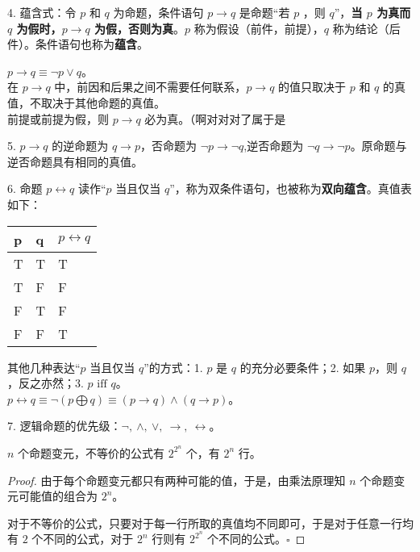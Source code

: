 \documentclass[normal,cyan]{elegantnote}
\newcommand{\QED}{\square}
\begin{document}
4. 蕴含式：令 $p$ 和 $q$ 为命题，条件语句 $p\to q$ 是命题“若 $p$ ，则 $q$”，\textbf{当 $p$ 为真而 $q$ 为假时，$p\to q$ 为假，否则为真}。$p$ 称为假设（前件，前提），$q$ 称为结论（后件）。条件语句也称为\textbf{蕴含}。

\begin{note}
    $p \to q \equiv \neg p \vee q$。
    \\在 $p \to q$ 中，前因和后果之间不需要任何联系，$p \to q$ 的值只取决于 $p$ 和 $q$ 的真值，不取决于其他命题的真值。\\ 前提或前提为假，则 $p \to q$ 必为真。（啊对对对了属于是
\end{note}

5. $p \to q$ 的逆命题为 $q \to p$，否命题为 $\neg p \to \neg q$,逆否命题为 $\neg q \to \neg p$。原命题与逆否命题具有相同的真值。

6. 命题 $p\leftrightarrow q$ 读作“$p$ 当且仅当 $q$”，称为双条件语句，也被称为\textbf{双向蕴含}。真值表如下：
\begin{table}[htbp]\centering
    \begin{tabular}{|l|l|l|}
    \hline
    p & q & $p \leftrightarrow q$ \\ \hline
    T & T & T                     \\ \hline
    T & F & F                     \\ \hline
    F & T & F                     \\ \hline
    F & F & T                     \\ \hline
    \end{tabular}
    \end{table}

\begin{note}
    其他几种表达“$p$ 当且仅当 $q$”的方式：1. $p$ 是 $q$ 的充分必要条件；2. 如果 $p$，则 $q$，反之亦然；3. $p$ $\text{iff}$ $q$。
    \\ $p \leftrightarrow q\equiv \neg\left(p \bigoplus q\right) \equiv \left(p \to q\right) \wedge \left(q \to p \right)$。
\end{note}

7. 逻辑命题的优先级：$\neg,\ \wedge,\ \vee,\ \to,\ \leftrightarrow$。

\begin{theorem}$n$ 个命题变元，不等价的公式有 $2^{2^n}$ 个，有 $2^n$ 行。\end{theorem}
\begin{proof}
    由于每个命题变元都只有两种可能的值，于是，由乘法原理知 $n$ 个命题变元可能值的组合为 $2^n$。
    
    对于不等价的公式，只要对于每一行所取的真值均不同即可，于是对于任意一行均有 $2$ 个不同的公式，对于 $2^n$ 行则有 $2^{2^n}$ 个不同的公式。$\QED$
\end{proof}
\end{document}
